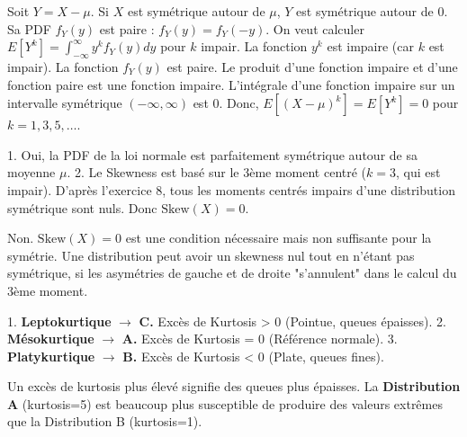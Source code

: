 \begin{correctionbox}
Soit $Y = X-\mu$. Si $X$ est symétrique autour de $\mu$, $Y$ est symétrique autour de 0. Sa PDF $f_Y(y)$ est paire : $f_Y(y) = f_Y(-y)$.
On veut calculer $E[Y^k] = \int_{-\infty}^{\infty} y^k f_Y(y) dy$ pour $k$ impair.
La fonction $y^k$ est impaire (car $k$ est impair).
La fonction $f_Y(y)$ est paire.
Le produit d'une fonction impaire et d'une fonction paire est une fonction impaire.
L'intégrale d'une fonction impaire sur un intervalle symétrique $(-\infty, \infty)$ est 0.
Donc, $E[(X-\mu)^k] = E[Y^k] = 0$ pour $k=1, 3, 5, \dots$.
\end{correctionbox}

\begin{correctionbox}
1.  Oui, la PDF de la loi normale est parfaitement symétrique autour de sa moyenne $\mu$.
2.  Le Skewness est basé sur le 3ème moment centré ($k=3$, qui est impair). D'après l'exercice 8, tous les moments centrés impairs d'une distribution symétrique sont nuls.
    Donc $\text{Skew}(X) = 0$.
\end{correctionbox}

\begin{correctionbox}
Non. $\text{Skew}(X)=0$ est une condition nécessaire mais non suffisante pour la symétrie. Une distribution peut avoir un skewness nul tout en n'étant pas symétrique, si les asymétries de gauche et de droite "s'annulent" dans le calcul du 3ème moment.
\end{correctionbox}


\begin{correctionbox}
1.  \textbf{Leptokurtique} $\rightarrow$ \textbf{C.} Excès de Kurtosis > 0 (Pointue, queues épaisses).
2.  \textbf{Mésokurtique} $\rightarrow$ \textbf{A.} Excès de Kurtosis = 0 (Référence normale).
3.  \textbf{Platykurtique} $\rightarrow$ \textbf{B.} Excès de Kurtosis < 0 (Plate, queues fines).
\end{correctionbox}

\begin{correctionbox}
Un excès de kurtosis plus élevé signifie des queues plus épaisses.
La \textbf{Distribution A} (kurtosis=5) est beaucoup plus susceptible de produire des valeurs extrêmes que la Distribution B (kurtosis=1).
\end{correctionbox}

